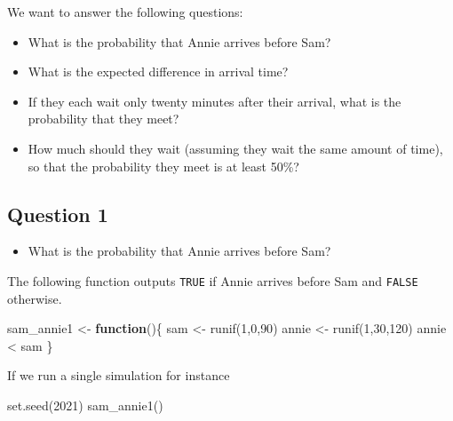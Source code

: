 \documentclass[
]{book}
\newenvironment{Shaded}{\begin{snugshade}}{\end{snugshade}}
\newcommand{\ControlFlowTok}[1]{\textcolor[rgb]{0.13,0.29,0.53}{\textbf{#1}}}
\newcommand{\DecValTok}[1]{\textcolor[rgb]{0.00,0.00,0.81}{#1}}
\newcommand{\FunctionTok}[1]{\textcolor[rgb]{0.00,0.00,0.00}{#1}}
\newcommand{\NormalTok}[1]{#1}
\newcommand{\OtherTok}[1]{\textcolor[rgb]{0.56,0.35,0.01}{#1}}
\newcommand{\SpecialCharTok}[1]{\textcolor[rgb]{0.00,0.00,0.00}{#1}}
\providecommand{\tightlist}{%
  \setlength{\itemsep}{0pt}\setlength{\parskip}{0pt}}
\begin{document}
We want to answer the following questions:

\begin{itemize}
\item
  What is the probability that Annie arrives before Sam?
\item
  What is the expected difference in arrival time?
\item
  If they each wait only twenty minutes after their arrival, what is the probability that they meet?
\item
  How much should they wait (assuming they wait the same amount of time), so that the probability they meet is at least 50\%?
\end{itemize}

\hypertarget{question-1-1}{%
\subsection{Question 1}\label{question-1-1}}

\begin{itemize}
\tightlist
\item
  What is the probability that Annie arrives before Sam?
\end{itemize}

The following function outputs \texttt{TRUE} if Annie arrives before Sam and \texttt{FALSE} otherwise.

\begin{Shaded}
\begin{Highlighting}[]
\NormalTok{sam\_annie1 }\OtherTok{\textless{}{-}} \ControlFlowTok{function}\NormalTok{()\{}
\NormalTok{  sam }\OtherTok{\textless{}{-}} \FunctionTok{runif}\NormalTok{(}\DecValTok{1}\NormalTok{,}\DecValTok{0}\NormalTok{,}\DecValTok{90}\NormalTok{)}
\NormalTok{  annie }\OtherTok{\textless{}{-}} \FunctionTok{runif}\NormalTok{(}\DecValTok{1}\NormalTok{,}\DecValTok{30}\NormalTok{,}\DecValTok{120}\NormalTok{)}
\NormalTok{  annie }\SpecialCharTok{\textless{}}\NormalTok{ sam}
\NormalTok{\}}
\end{Highlighting}
\end{Shaded}

If we run a single simulation for instance

\begin{Shaded}
\begin{Highlighting}[]
\FunctionTok{set.seed}\NormalTok{(}\DecValTok{2021}\NormalTok{)}
\FunctionTok{sam\_annie1}\NormalTok{()}
\end{Highlighting}
\end{Shaded}
\end{document}
